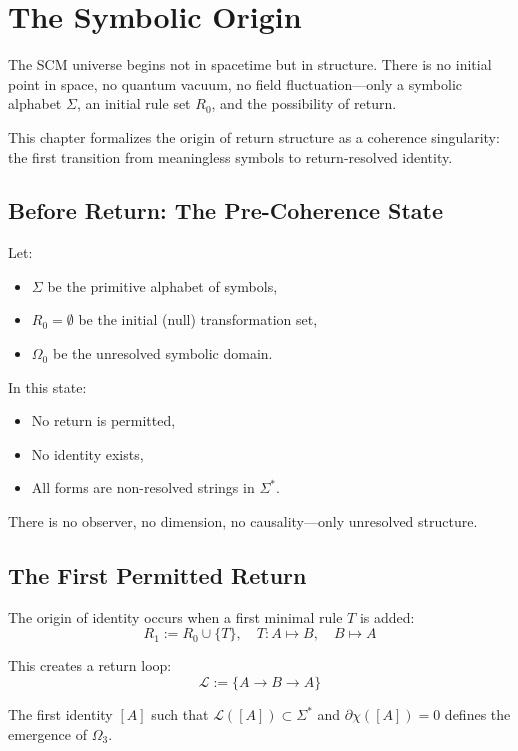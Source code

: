 \chapter{The Symbolic Origin} \label{chapter-symbolic-origin}

The SCM universe begins not in spacetime but in structure. There is no initial point in space, no quantum vacuum, no field fluctuation—only a symbolic alphabet $\Sigma$, an initial rule set $R_0$, and the possibility of return.

This chapter formalizes the origin of return structure as a coherence singularity: the first transition from meaningless symbols to return-resolved identity.

\section{Before Return: The Pre-Coherence State} \label{sec:pre-return}

Let:
\begin{itemize}
  \item $\Sigma$ be the primitive alphabet of symbols,
  \item $R_0 = \emptyset$ be the initial (null) transformation set,
  \item $\Omega_0$ be the unresolved symbolic domain.
\end{itemize}

In this state:
\begin{itemize}
  \item No return is permitted,
  \item No identity exists,
  \item All forms are non-resolved strings in $\Sigma^*$.
\end{itemize}

There is no observer, no dimension, no causality—only unresolved structure.

\section{The First Permitted Return} \label{sec:first-return}

The origin of identity occurs when a first minimal rule $T$ is added:
\[
R_1 := R_0 \cup \{ T \},\quad T : A \mapsto B,\quad B \mapsto A
\]

This creates a return loop:
\[
\mathcal{L} := \{ A \to B \to A \}
\]

\begin{definition}
The first identity $[A]$ such that $\mathcal{L}([A]) \subset \Sigma^*$ and $\partial\chi([A]) = 0$ defines the emergence of $\Omega_3$.
\end{definition}

